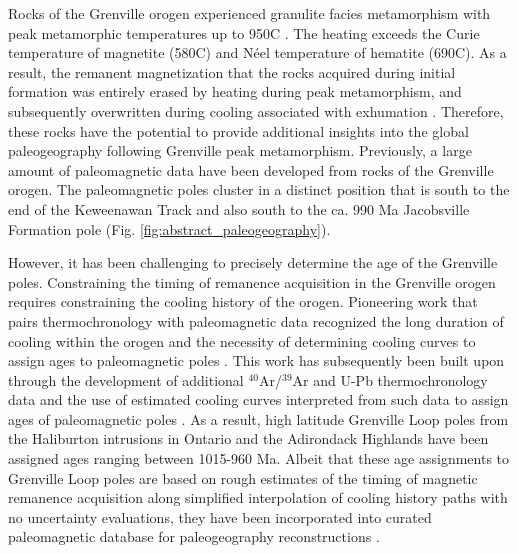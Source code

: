 Rocks of the Grenville orogen experienced granulite facies metamorphism with peak metamorphic temperatures up to 950\textdegree C \citep[e.g.][]{Shinevar2021a, Metzger2021a}. The heating exceeds the Curie temperature of magnetite (580\textdegree C) and N\'eel temperature of hematite (690\textdegree C). As a result, the remanent magnetization that the rocks acquired during initial formation was entirely erased by heating during peak metamorphism, and subsequently overwritten during cooling associated with exhumation \citep{McWilliams1975a}. Therefore, these rocks have the potential to provide additional insights into the global paleogeography following Grenville peak metamorphism. Previously, a large amount of paleomagnetic data have been developed from rocks of the Grenville orogen. The paleomagnetic poles cluster in a distinct position that is south to the end of the Keweenawan Track and also south to the ca. 990 Ma Jacobsville Formation pole (Fig. \ref{fig:abstract_paleogeography}). 

However, it has been challenging to precisely determine the age of the Grenville poles. Constraining the timing of remanence acquisition in the Grenville orogen requires constraining the cooling history of the orogen. Pioneering work that pairs thermochronology with paleomagnetic data recognized the long duration of cooling within the orogen and the necessity of determining cooling curves to assign ages to paleomagnetic poles \citep{Berger1979a}. This work has subsequently been built upon through the development of additional $^{40}$Ar/$^{39}$Ar and U-Pb thermochronology data \citep[e.g.][]{Mezger1991a, Warnock2000a} and the use of estimated cooling curves interpreted from such data to assign ages of paleomagnetic poles \citep[e.g.][]{Warnock2000a, Brown2012a}. As a result, high latitude Grenville Loop poles from the Haliburton intrusions in Ontario and the Adirondack Highlands have been assigned ages ranging between 1015-960 Ma. Albeit that these age assignments to Grenville Loop poles are based on rough estimates of the timing of magnetic remanence acquisition along simplified interpolation of cooling history paths with no uncertainty evaluations, they have been incorporated into curated paleomagnetic database for paleogeography reconstructions \cite[e.g.][]{Weil2003a, Evans2021a}.  

